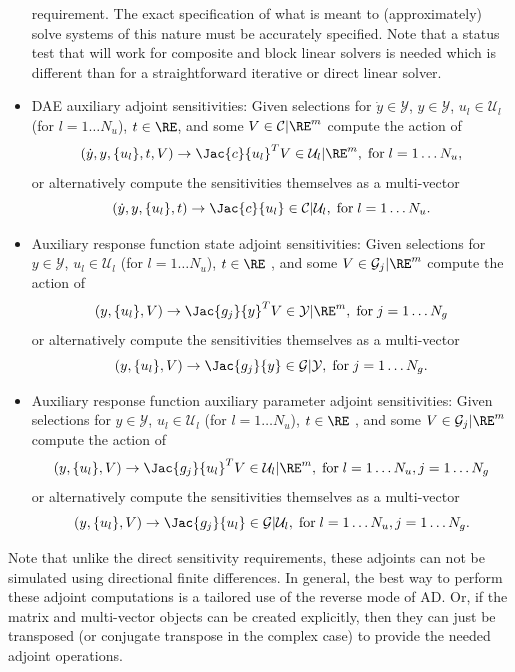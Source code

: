 \documentclass[pdf,ps2pdf,11pt]{SANDreport}
\begin{document}
\begin{itemize}
requirement.  The exact specification of what is meant to (approximately)
solve systems of this nature must be accurately specified. Note that a status
test that will work for composite and block linear solvers is needed which is
different than for a straightforward iterative or direct linear solver.
%
{}\item DAE auxiliary adjoint sensitivities: Given selections for
$\dot{y}\in\mathcal{Y}$, $y\in\mathcal{Y}$, $u_l\in\mathcal{U}_l$ (for
$l=1\ldots{}N_u$), $t\in\RE$, and some $V\in\mathcal{C}|\RE^m$ compute
the action of
\[
(\dot{y},y,\{u_l\},t,V) {}\rightarrow \Jac{c}{u_l}^T V \in \mathcal{U}_l|\RE^m,
\; \mbox{for} \; l = 1 {}\ldots N_u,
\]
or alternatively compute the sensitivities themselves as a multi-vector
\[
(\dot{y},y,\{u_l\},t) {}\rightarrow \Jac{c}{u_l} \in \mathcal{C}|\mathcal{U}_l,
\; \mbox{for} \; l = 1 {}\ldots N_u.
\]

{}\item Auxiliary response function state adjoint sensitivities: Given selections for
$y\in\mathcal{Y}$, $u_l\in\mathcal{U}_l$ (for $l=1\ldots{}N_u$), $t\in\RE$ ,
and some $V\in\mathcal{G}_j|\RE^m$ compute the action of
\[
(y,\{u_l\},V) {}\rightarrow \Jac{g_j}{y}^T V \in \mathcal{Y}|\RE^m,
\; \mbox{for} \; j = 1 \ldots N_g
\]
or alternatively compute the sensitivities themselves as a multi-vector
\[
(y,\{u_l\},V) {}\rightarrow \Jac{g_j}{y} \in \mathcal{G}|\mathcal{Y},
\; \mbox{for} \; j = 1 \ldots N_g.
\]

{}\item Auxiliary response function auxiliary parameter adjoint
sensitivities: Given selections for $y\in\mathcal{Y}$,
$u_l\in\mathcal{U}_l$ (for $l=1\ldots{}N_u$), $t\in\RE$ , and some
$V\in\mathcal{G}_j|\RE^m$ compute the action of
\[
(y,\{u_l\},V) {}\rightarrow \Jac{g_j}{u_l}^T V \in \mathcal{U}_l|\RE^m,
\; \mbox{for} \; l = 1 {}\ldots N_u, j = 1 \ldots N_g
\]
or alternatively compute the sensitivities themselves as a multi-vector
\[
(y,\{u_l\},V) {}\rightarrow \Jac{g_j}{u_l} \in \mathcal{G}|\mathcal{U}_l,
\; \mbox{for} \; l = 1 {}\ldots N_u, j = 1 \ldots N_g.
\]

\end{itemize}

Note that unlike the direct sensitivity requirements, these adjoints can not
be simulated using directional finite differences.  In general, the best way
to perform these adjoint computations is a tailored use of the reverse mode of
AD.  Or, if the matrix and multi-vector objects can be created explicitly,
then they can just be transposed (or conjugate transpose in the complex case)
to provide the needed adjoint operations.
\end{document}
